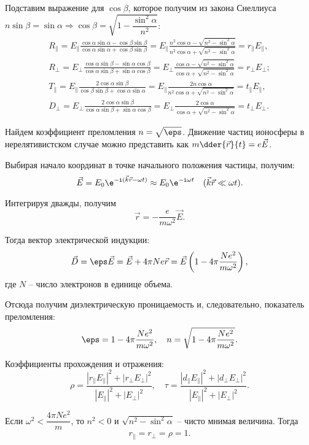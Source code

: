 Подставим выражение для \( \cos\beta \), которое получим из закона Снеллиуса
\( n\sin\beta = \sin\alpha \Rightarrow \cos\beta = \sqrt{1 -
\dfrac{\sin^2\alpha}{n^2}} \):
\begin{gather*}
    R_\| = E_\|\frac{\cos\alpha\sin\alpha - \cos\beta\sin\beta}
    {\cos\alpha\sin\alpha + \cos\beta\sin\beta} = E_\|\frac{n^2\cos\alpha-
    \sqrt{n^2-\sin^2\alpha}}{n^2\cos\alpha + \sqrt{n^2 - \sin^2\alpha}} =
    r_\|E_\|, \\
    R_\perp = E_\perp\frac{\cos\alpha\sin\beta - \sin\alpha\cos\beta}
    {\cos\alpha\sin\beta + \sin\alpha\cos\beta} = E_\perp\frac{\cos\alpha -
    \sqrt{n^2-\sin^2\alpha}}{\cos\alpha + \sqrt{n^2-\sin^2\alpha}} = 
    r_\perp E_\perp; \\
    T_\| = E_\|\frac{2\cos\alpha\sin\beta}{\cos\beta\sin\beta + \cos\alpha
    \sin\alpha} = E_\|\frac{2n\cos\alpha}{n^2\cos\alpha + \sqrt{n^2-
    \sin^2\alpha}} = t_\|E_\|, \\
    D_\perp = E_\perp\frac{2\cos\alpha\sin\beta}{\cos\alpha\sin\beta +
    \sin\alpha\cos\beta} = E_\perp\frac{2\cos\alpha}{\cos\alpha + \sqrt{n^2-
    \sin^2\alpha}} = t_\perp E_\perp.
\end{gather*}

Найдем коэффициент преломления \( n = \sqrt{\eps} \). Движение частиц ионосферы
в нерелятивистском случае можно представить как \( \ds m\dder{\vec{r}}{t} =
e\vec{E} \).

Выбирая начало координат в точке начального положения частицы, получим:
\[
    \vec{E} = E_0\e^{-\i(\vec{k}\vec{r} - \omega t)} \approx
    E_0\e^{-\i\omega t} \quad (\vec{k}\vec{r} \ll \omega t).
\]

Интегрируя дважды, получим
\[
    \vec{r} = -\frac{e}{m\omega^2}\vec{E}.
\]

Тогда вектор электрической индукции:
\[
    \vec{D} = \eps\vec{E} = \vec{E} + 4\pi Ne\vec{r} = \vec{E}
    \left(1 - 4\pi\frac{Ne^2}{m\omega^2}\right),
\]
где \( N \) -- число электронов в единице объема.

Отсюда получим диэлектрическую проницаемость и, следовательно, показатель
преломления:
\[
    \eps = 1 - 4\pi\frac{Ne^2}{m\omega^2}, \quad n = \sqrt{1 - 4\pi\frac{Ne^2}
    {m\omega^2}}.
\]

Коэффициенты прохождения и отражения:
\[
    \rho = \frac{|r_\|E_\||^2 + |r_\perp E_\perp|^2}{|E_\||^2 + |E_\perp|^2},
    \quad \tau = \frac{|d_\|E_\||^2 + |d_\perp E_\perp|^2}{|E_\||^2 +
    |E_\perp|^2}.
\]

Если \( \omega^2 < \dfrac{4\pi Ne^2}{m} \), то \( n^2 < 0 \) и
\( \sqrt{n^2 - \sin^2\alpha} \) -- чисто мнимая величина. Тогда
\[
    r_\| = r_\perp = \rho = 1.
\]

